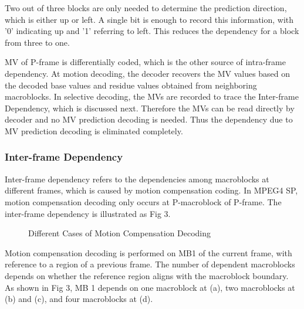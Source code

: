 Two out of three blocks are only needed to determine the prediction direction, which is either up or left. A single bit is enough to record this information, with '0' indicating up and '1' referring to left. This reduces the dependency for a block from three to one.

MV of P-frame is differentially coded, which is the other source of intra-frame dependency. At motion decoding, the decoder recovers the MV values based on the decoded base values and residue values obtained from neighboring macroblocks. In selective decoding, the MVs are recorded to trace the Inter-frame Dependency, which is discussed next. Therefore the MVs can be read directly by decoder and no MV prediction decoding is needed. Thus the dependency due to MV prediction decoding is eliminated completely.
  
\subsubsection{Inter-frame Dependency}
Inter-frame dependency refers to the dependencies among macroblocks at different frames, which is caused by motion compensation coding. In MPEG4 SP, motion compensation decoding only occurs at P-macroblock of P-frame. The inter-frame dependency is illustrated as Fig 3.

\begin{figure}
\centering
\quad
{}
\quad
{}
\quad
{}
\caption{Different Cases of Motion Compensation Decoding}
\end{figure}
Motion compensation decoding is performed on MB1 of the current frame, with reference to a region of a previous frame. The number of dependent macroblocks depends on whether the reference region aligns with the macroblock boundary. As shown in Fig 3, MB 1 depends on one macroblock at (a), two macroblocks at (b) and (c), and four macroblocks at (d). 


